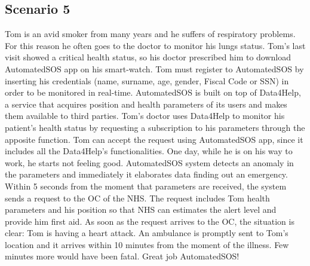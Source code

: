     \subsection{Scenario 5}
    Tom is an avid smoker from many years and he suffers of respiratory problems. For this reason he often goes to the doctor to monitor his lungs status.
    Tom's last visit showed a critical health status, so his doctor prescribed him to download AutomatedSOS app on his smart-watch.
    Tom must register to AutomatedSOS by inserting his credentials (name, surname, age, gender, Fiscal Code or SSN) in order to be monitored in real-time.
    AutomatedSOS is built on top of Data4Help, a service that acquires position and health parameters of its users and makes them available to third parties.
    Tom's doctor uses Data4Help to monitor his patient's health status by requesting a subscription to his parameters through the apposite function.
    Tom can accept the request using AutomatedSOS app, since it includes all the Data4Help's functionalities.
    One day, while he is on his way to work, he starts not feeling good. AutomatedSOS system detects an anomaly in the parameters and immediately it elaborates data finding out an emergency. 
    Within 5 seconds from the moment that parameters are received, the system sends a request to the OC of the NHS.
    The request includes Tom health parameters and his position so that NHS can estimates the alert level and provide him first aid.
    As soon as the request arrives to the OC, the situation is clear: Tom is having a heart attack. An ambulance is promptly sent to Tom's location and it arrives within 10 minutes from the moment of the illness.
    Few minutes more would have been fatal.
    Great job AutomatedSOS!
    
